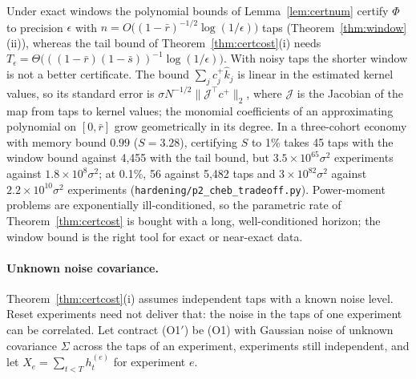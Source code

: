 \begin{remark}\label{rem:cheb}
Under exact windows the polynomial bounds of Lemma~\ref{lem:certnum} certify $\Phi$ to precision $\epsilon$ with $n=O\bigl((1-\bar r)^{-1/2}\log(1/\epsilon)\bigr)$ taps (Theorem~\ref{thm:window}(ii)), whereas the tail bound of Theorem~\ref{thm:certcost}(i) needs $T_\epsilon=\Theta\bigl(((1-\bar r)(1-\bar s))^{-1}\log(1/\epsilon)\bigr)$. With noisy taps the shorter window is not a better certificate. The bound $\sum_jc^+_j\hat k_j$ is linear in the estimated kernel values, so its standard error is $\sigma N^{-1/2}\|\mathcal J^\top c^+\|_2$, where $\mathcal J$ is the Jacobian of the map from taps to kernel values; the monomial coefficients of an approximating polynomial on $[0,\bar r]$ grow geometrically in its degree. In a three-cohort economy with memory bound $0.99$ ($S=3.28$), certifying $S$ to 1\% takes 45 taps with the window bound against 4{,}455 with the tail bound, but $3.5\times10^{65}\sigma^2$ experiments against $1.8\times10^{8}\sigma^2$; at 0.1\%, 56 against 5{,}482 taps and $3\times10^{82}\sigma^2$ against $2.2\times10^{10}\sigma^2$ experiments (\texttt{hardening/p2\_cheb\_tradeoff.py}). Power-moment problems are exponentially ill-conditioned, so the parametric rate of Theorem~\ref{thm:certcost} is bought with a long, well-conditioned horizon; the window bound is the right tool for exact or near-exact data.
\end{remark}

\paragraph{Unknown noise covariance.} Theorem~\ref{thm:certcost}(i) assumes independent taps with a known noise level. Reset experiments need not deliver that: the noise in the taps of one experiment can be correlated. Let contract (O1$'$) be (O1) with Gaussian noise of unknown covariance $\Sigma$ across the taps of an experiment, experiments still independent, and let $X_e=\sum_{t<T}h^{(e)}_t$ for experiment $e$.

